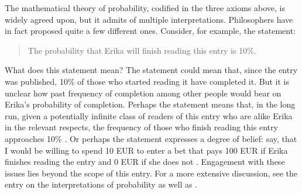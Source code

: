 \documentclass{article}
\begin{document}



%

The mathematical theory of probability, codified in the three axioms above, is widely  agreed upon, but it admits of multiple interpretations. Philosophers have in fact proposed quite a few different ones.
%
Consider, for example, the statement:
\begin{quote}
	The probability that Erika will finish reading this entry is  10\%.
\end{quote}
What does this statement mean? 
The statement could mean that, since the entry was published, 10\% of those who started reading it have completed it. But it is unclear how past frequency of completion among other people would bear on Erika's  probability of completion. Perhaps the statement means that, in the long run, given a potentially infinite class of readers of this entry who are alike Erika in the relevant respects, the frequency of those who finish reading this entry approaches 10\% \citep{Mises1957}. %
	 Or perhaps the statement  expresses a degree of belief: say, that I would be willing to spend 10 EUR to enter a bet that pays 100 EUR if Erika finishes reading the entry and 0 EUR if she does not \citep{De-Finetti1979Theory-of-Proba}.
%
Engagement with these issues lies beyond the scope of this entry. For a more extensive discussion, see the entry on the interpretations of probability \citep{sep-probability-interpret} 
as well as \citep{skyrms1968choice,gillies2000philosophical,mellor2004probability,childers2013philosophy}. 
\end{document}
